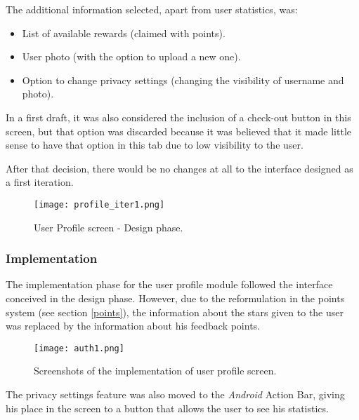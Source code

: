 The additional information selected, apart from user statistics, was:

\begin{itemize}
\item List of available rewards (claimed with points).
\item User photo (with the option to upload a new one).
\item Option to change privacy settings (changing the visibility of username and photo).
\end{itemize}

In a first draft, it was also considered the inclusion of a check-out button in this screen, but that option was discarded because it was believed that it made little sense to have that option in this tab due to low visibility to the user.

After that decision, there would be no changes at all to the interface designed as a first iteration.

\begin{figure}[h!]
  \begin{center}
    \leavevmode
    \texttt{[image: profile\_iter1.png]}
    \caption{User Profile screen - Design phase.}
    \label{fig:profile_iter1}
  \end{center}
\end{figure}

\subsubsection{Implementation}

The implementation phase for the user profile module followed the interface conceived in the design phase. However, due to the reformulation in the points system (see section \ref{points}), the information about the stars given to the user was replaced by the information about his feedback points.

\begin{figure}[h!]
  \begin{center}
    \leavevmode
    \texttt{[image: auth1.png]}
    \caption{Screenshots of the implementation of user profile screen.}
    \label{fig:profile_impl}
  \end{center}
\end{figure}

The privacy settings feature was also moved to the \emph{Android} Action Bar, giving his place in the screen to a button that allows the user to see his statistics.

